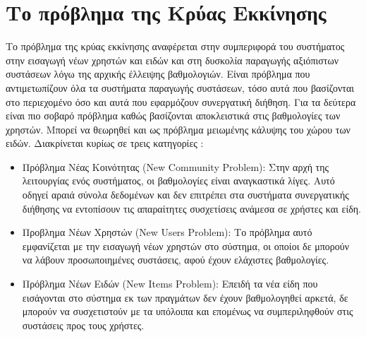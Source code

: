 \section{Το πρόβλημα της Κρύας Εκκίνησης} 
Το πρόβλημα της κρύας εκκίνησης αναφέρεται στην συμπεριφορά του συστήματος στην εισαγωγή νέων χρηστών και ειδών και στη δυσκολία παραγωγής αξιόπιστων συστάσεων λόγω της αρχικής έλλειψης βαθμολογιών. Είναι πρόβλημα που αντιμετωπίζουν όλα τα συστήματα παραγωγής συστάσεων, τόσο αυτά που βασίζονται στο περιεχομένο όσο και αυτά που εφαρμόζουν συνεργατική διήθηση. Για τα δεύτερα είναι πιο σοβαρό πρόβλημα καθώς βασίζονται αποκλειστικά στις βαθμολογίες των χρηστών. Μπορεί να θεωρηθεί και ως πρόβλημα μειωμένης κάλυψης του χώρου των ειδών.\cite{ricci2011recommender} Διακρίνεται κυρίως σε τρεις κατηγορίες \cite{Nikolakopoulos2015126}: 
\begin{itemize}
 \item Πρόβλημα Νέας Κοινότητας ({\en New Community Problem}): Στην αρχή της λειτουργίας ενός συστήματος, οι βαθμολογίες είναι αναγκαστικά λίγες. Αυτό οδηγεί αραιά σύνολα δεδομένων και δεν επιτρέπει στα συστήματα συνεργατικής διήθησης να εντοπίσουν τις απαραίτητες συσχετίσεις ανάμεσα σε χρήστες και είδη.
 \item Προβλημα Νέων Χρηστών ({\en New Users Problem}): Το πρόβλημα αυτό εμφανίζεται με την εισαγωγή νέων χρηστών στο σύστημα, οι οποίοι δε μπορούν να λάβουν προσωποιημένες συστάσεις, αφού έχουν ελάχιστες βαθμολογίες.
 \item Πρόβλημα Νέων Ειδών ({\en New Items Problem}): Επειδή τα νέα είδη που εισάγονται στο σύστημα εκ των πραγμάτων δεν έχουν βαθμολογηθεί αρκετά, δε μπορούν να συσχετιστούν με τα υπόλοιπα και επομένως να συμπεριληφθούν στις συστάσεις προς τους χρήστες. 
\end{itemize}